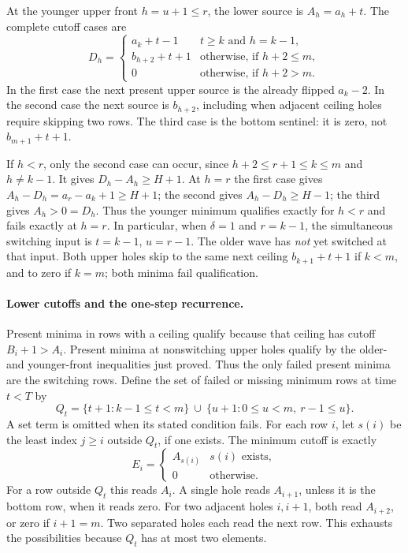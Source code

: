 At the younger upper front $h=u+1\le r$, the lower source is $A_h=a_h+t$. The complete cutoff cases are
\[
 D_h=\begin{cases}
 a_k+t-1&t\ge k\text{ and }h=k-1,\\
 b_{h+2}+t+1&\text{otherwise, if }h+2\le m,\\
 0&\text{otherwise, if }h+2>m.
 \end{cases}
\]
In the first case the next present upper source is the already flipped $a_k-2$. In the second case the next source is $b_{h+2}$, including when adjacent ceiling holes require skipping two rows. The third case is the bottom sentinel: it is zero, not $b_{m+1}+t+1$.

If $h<r$, only the second case can occur, since $h+2\le r+1\le k\le m$ and $h\ne k-1$. It gives $D_h-A_h\ge H+1$. At $h=r$ the first case gives $A_h-D_h=a_r-a_k+1\ge H+1$; the second gives $A_h-D_h\ge H-1$; the third gives $A_h>0=D_h$. Thus the younger minimum qualifies exactly for $h<r$ and fails exactly at $h=r$. In particular, when $\delta=1$ and $r=k-1$, the simultaneous switching input is $t=k-1$, $u=r-1$. The older wave has \emph{not} yet switched at that input. Both upper holes skip to the same next ceiling $b_{k+1}+t+1$ if $k<m$, and to zero if $k=m$; both minima fail qualification.

\paragraph{Lower cutoffs and the one-step recurrence.}
Present minima in rows with a ceiling qualify because that ceiling has cutoff $B_i+1>A_i$. Present minima at nonswitching upper holes qualify by the older- and younger-front inequalities just proved. Thus the only failed present minima are the switching rows. Define the set of failed or missing minimum rows at time $t<T$ by
\[
 Q_t=\{t+1:k-1\le t<m\}\ \cup\
     \{u+1:0\le u<m,\ r-1\le u\}.
\]
A set term is omitted when its stated condition fails. For each row $i$, let $s(i)$ be the least index $j\ge i$ outside $Q_t$, if one exists. The minimum cutoff is exactly
\[
 E_i=\begin{cases}A_{s(i)}&s(i)\text{ exists},\\0&\text{otherwise}.
 \end{cases}
\]
For a row outside $Q_t$ this reads $A_i$. A single hole reads $A_{i+1}$, unless it is the bottom row, when it reads zero. For two adjacent holes $i,i+1$, both read $A_{i+2}$, or zero if $i+1=m$. Two separated holes each read the next row. This exhausts the possibilities because $Q_t$ has at most two elements.

